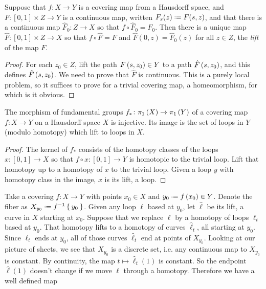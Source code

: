 \begin{proposition}
Suppose that \(f \colon X \to Y\) is a covering map from a Hausdorff space, and \(F \colon [0,1] \times Z \to Y\) is a continuous map, written \(F_s(z)\defeq F(s,z)\), and that there is a continuous map \(\hat{F}_0 \colon Z \to X\) so that \(f \circ \hat{F}_0 = F_0\).
Then there is a unique map \(\hat{F} \colon [0,1] \times Z \to X\) so that \(f \circ \hat{F}=F\) and \(\hat{F}(0,z)=\hat{F}_0(z)\) for all \(z \in Z\), the \emph{lift} of the map \(F\).
\end{proposition}
\begin{proof}
For each \(z_0 \in Z\), lift the path \(F\left(s,z_0\right) \in Y\) to a path \(\hat{F}\left(s,z_0\right)\), and this defines \(\hat{F}\left(s,z_0\right)\).
We need to prove that \(\hat{F}\) is continuous.
This is a purely local problem, so it suffices to prove for a trivial covering map, a homeomorphism, for which is it obvious.
\end{proof}
\begin{lemma}
The morphism of fundamental groups \(f_* \colon \pi_{1}\left(X\right) \to \pi_{1}\left(Y\right)\) of a covering map \(f \colon X \to Y\) on a Hausdorff space \(X\) is injective.
Its image is the set of loops in \(Y\) (modulo homotopy) which lift to loops in \(X\).
\end{lemma}
\begin{proof}
The kernel of \(f_*\) consists of the homotopy classes of the loops \(x \colon [0,1] \to X\) so that \(f \circ x \colon [0,1] \to Y\) is homotopic to the trivial loop.
Lift that homotopy up to a homotopy of \(x\) to the trivial loop.
Given a loop \(y\) with homotopy class in the image, \(x\) is its lift, a loop.
\end{proof}
Take a covering \(f \colon X \to Y\) with points \(x_0 \in X\) and \(y_0\defeq f\of{x_0} \in Y\).
Denote the fiber as \(X_{y_0}\defeq f^{-1}\Set{y_0}\). 
Given any loop \(\ell\) based at \(y_0\), let \(\hat{\ell}\) be its lift, a curve in \(X\) starting at \(x_0\).
Suppose that we replace \(\ell\) by a homotopy of loops \(\ell_t\) based at \(y_0\).
That homotopy lifts to a homotopy of curves \(\hat{\ell}_t\), all starting at \(y_0\).
Since \(\ell_t\) ends at \(y_0\), all of those curves \(\hat{\ell}_t\) end at points of \(X_{y_0}\).
Looking at our picture of sheets, we see that \(X_{y_0}\) is a discrete set, i.e. any continuous map to \(X_{y_0}\) is constant.
By continuity, the map \(t \mapsto \hat{\ell}_t(1)\) is constant.
So the endpoint \(\hat{\ell}(1)\) doesn't change if we move \(\ell\) through a homotopy.
Therefore we have a well defined map
